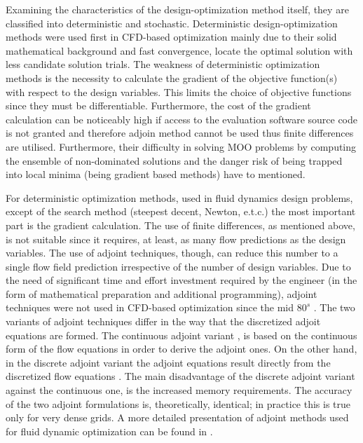 Examining the characteristics of the design-optimization method itself,  they are classified into deterministic and stochastic. Deterministic design-optimization methods were used first in CFD-based optimization mainly due to their solid mathematical background and fast convergence, locate the optimal solution with less candidate solution trials. The weakness of deterministic optimization methods is the necessity to calculate the gradient of the objective function(s) with respect to the design variables. This limits the choice of objective functions since they must be differentiable. Furthermore, the cost of the gradient calculation can be noticeably high if access to the evaluation software source code is not granted and therefore adjoin method cannot be used thus finite differences are utilised. Furthermore, their difficulty in solving MOO problems by computing the ensemble of non-dominated solutions and the danger risk of being trapped into local minima (being gradient based methods) have to mentioned.        

For deterministic optimization methods, used in fluid dynamics design problems, except of the search method (steepest decent, Newton, e.t.c.) the most important part is the gradient calculation. The use of finite differences, as mentioned above, is not suitable since it requires, at least, as many flow predictions as the design variables. The use of adjoint techniques, though, can reduce this number to a single flow field prediction irrespective of the number of design variables. Due to the need of significant time and effort investment required by the engineer (in the form of mathematical preparation and additional programming), adjoint techniques were not used in CFD-based optimization since the mid $80^s$ \cite{piron:84, kn:Jame88, kn:Jame94, kn:Jame95}.  The two variants of adjoint techniques differ in the way that the discretized adjoit equations are formed. The continuous adjoint variant \cite{kn:Jame94, kn:Ander99,phd:papadim}, is based on the continuous form of the flow equations in order to derive the adjoint ones. On the other hand, in the discrete adjoint variant the adjoint equations result directly from the discretized flow equations \cite{kn:Elliott96, anderson:99}. The main disadvantage of the discrete adjoint variant against the continuous one, is the increased memory requirements. The accuracy of the two adjoint formulations is, theoretically, identical; in practice this is true only for very dense grids.  A more detailed presentation of adjoint methods used for fluid dynamic optimization can be found in \cite{phd:papadim}.        

